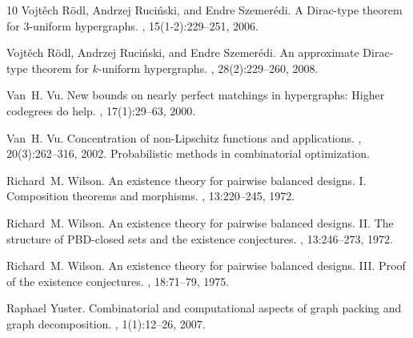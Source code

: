 \documentclass[11pt]{article}
\numberwithin{equation}{section}
\newcounter{i}
\theoremstyle{plain}
\theoremstyle{plain} %
\theoremstyle{definition}
\begin{document}
\begin{thebibliography}{10}
Vojt\v{e}ch R\"{o}dl, Andrzej Ruci\'{n}ski, and Endre Szemer\'{e}di.
\newblock A {D}irac-type theorem for {$3$}-uniform hypergraphs.
, 15(1-2):229--251, 2006.

Vojt\v{e}ch R\"{o}dl, Andrzej Ruci\'{n}ski, and Endre Szemer\'{e}di.
\newblock An approximate {D}irac-type theorem for {$k$}-uniform hypergraphs.
, 28(2):229--260, 2008.

Van~H. Vu.
\newblock New bounds on nearly perfect matchings in hypergraphs: {H}igher
  codegrees do help.
, 17(1):29--63, 2000.

Van~H. Vu.
\newblock Concentration of non-{L}ipschitz functions and applications.
, 20(3):262--316, 2002.
\newblock Probabilistic methods in combinatorial optimization.

Richard~M. Wilson.
\newblock An existence theory for pairwise balanced designs. {I}. {C}omposition
  theorems and morphisms.
, 13:220--245, 1972.

Richard~M. Wilson.
\newblock An existence theory for pairwise balanced designs. {II}. {T}he
  structure of {PBD}-closed sets and the existence conjectures.
, 13:246--273, 1972.

Richard~M. Wilson.
\newblock An existence theory for pairwise balanced designs. {III}. {P}roof of
  the existence conjectures.
, 18:71--79, 1975.

Raphael Yuster.
\newblock Combinatorial and computational aspects of graph packing and graph
  decomposition.
, 1(1):12--26, 2007.

\end{thebibliography}
\end{document}
